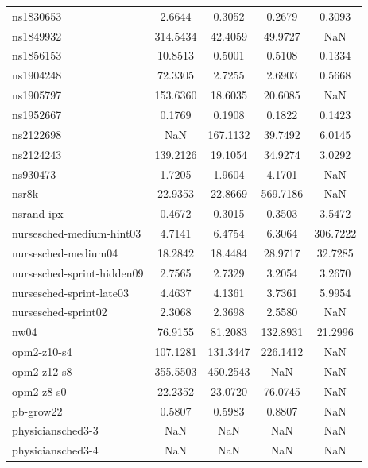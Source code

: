 \begin{longtable}{lcccc}
ns1830653                   &    2.6644 &   0.3052 &    0.2679 &    0.3093 \\
ns1849932                   &  314.5434 &  42.4059 &   49.9727 &       NaN \\
ns1856153                   &   10.8513 &   0.5001 &    0.5108 &    0.1334 \\
ns1904248                   &   72.3305 &   2.7255 &    2.6903 &    0.5668 \\
ns1905797                   &  153.6360 &  18.6035 &   20.6085 &       NaN \\
ns1952667                   &    0.1769 &   0.1908 &    0.1822 &    0.1423 \\
ns2122698                   &       NaN & 167.1132 &   39.7492 &    6.0145 \\
ns2124243                   &  139.2126 &  19.1054 &   34.9274 &    3.0292 \\
ns930473                    &    1.7205 &   1.9604 &    4.1701 &       NaN \\
nsr8k                       &   22.9353 &  22.8669 &  569.7186 &       NaN \\
nsrand-ipx                  &    0.4672 &   0.3015 &    0.3503 &    3.5472 \\
nursesched-medium-hint03    &    4.7141 &   6.4754 &    6.3064 &  306.7222 \\
nursesched-medium04         &   18.2842 &  18.4484 &   28.9717 &   32.7285 \\
nursesched-sprint-hidden09  &    2.7565 &   2.7329 &    3.2054 &    3.2670 \\
nursesched-sprint-late03    &    4.4637 &   4.1361 &    3.7361 &    5.9954 \\
nursesched-sprint02         &    2.3068 &   2.3698 &    2.5580 &       NaN \\
nw04                        &   76.9155 &  81.2083 &  132.8931 &   21.2996 \\
opm2-z10-s4                 &  107.1281 & 131.3447 &  226.1412 &       NaN \\
opm2-z12-s8                 &  355.5503 & 450.2543 &       NaN &       NaN \\
opm2-z8-s0                  &   22.2352 &  23.0720 &   76.0745 &       NaN \\
pb-grow22                   &    0.5807 &   0.5983 &    0.8807 &       NaN \\
physiciansched3-3           &       NaN &      NaN &       NaN &       NaN \\
physiciansched3-4           &       NaN &      NaN &       NaN &       NaN \\

\end{longtable}
